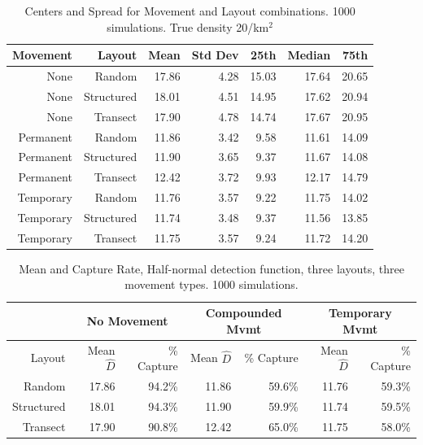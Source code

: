 \documentclass[12pt]{article}
\begin{document}
\begin{table}[h]

	\begin{tabular}{ r r| r r| r r r}
		Movement  & Layout     & Mean  & Std Dev & 25th  & Median & 75th  \\ \hline\hline
		None      & Random     & 17.86 & 4.28    & 15.03 & 17.64  & 20.65 \\
		None      & Structured & 18.01 & 4.51    & 14.95 & 17.62  & 20.94 \\
		None      & Transect   & 17.90 & 4.78    & 14.74 & 17.67  & 20.95 \\ \hline
		Permanent & Random     & 11.86 & 3.42    & 9.58  & 11.61  & 14.09 \\
		Permanent & Structured & 11.90 & 3.65    & 9.37  & 11.67  & 14.08 \\
		Permanent & Transect   & 12.42 & 3.72    & 9.93  & 12.17  & 14.79 \\ \hline
		Temporary & Random     & 11.76 & 3.57    & 9.22  & 11.75  & 14.02 \\
		Temporary & Structured & 11.74 & 3.48    & 9.37  & 11.56  & 13.85 \\
		Temporary & Transect   & 11.75 & 3.57    & 9.24  & 11.72  & 14.20
	\end{tabular}
	\caption{Centers and Spread for Movement and Layout combinations. 1000 simulations. True density 20/km$^2$}
	\label{table:sim2}
\end{table}
\begin{table}

	\begin{tabular}{ r| r r| r r| r r|}
	
		& \multicolumn{2}{|c|}{No Movement}	& \multicolumn{2}{|c|}{Compounded Mvmt}	& \multicolumn{2}{|c|}{Temporary Mvmt}\\ 
 \hline \hline
 
 Layout		& Mean $\hat{D}$	& \% Capture & Mean $\hat{D}$ & \% Capture & Mean $\hat{D}$ & \% Capture	\\ \hline \hline
 Random		& 17.86 			& 94.2\% 		& 11.86	& 59.6\%	& 11.76	& 59.3\% \\
 Structured	& 18.01 			& 94.3\% 		& 11.90 & 59.9\% 	& 11.74 & 59.5\% \\
 Transect	& 17.90 			& 90.8\% 		& 12.42 & 65.0\% 	& 11.75 & 58.0\% \\ \hline

	\end{tabular}
	\caption{Mean and Capture Rate, Half-normal detection function, three layouts, three movement types. 1000 simulations.}
	\label{table:sim2capture}
\end{table}
\end{document}
